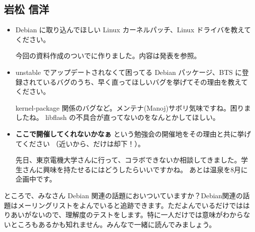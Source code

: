 \documentclass[mingoth,a4paper]{jsarticle}
\begin{document}
\subsection{岩松 信洋}
\begin{itemize}
\item Debian に取り込んでほしい Linux カーネルパッチ、Linux ドライバを教えてください。

今回の資料作成のついでに作りました。内容は発表を参照。

\item unstable でアップデートされなくて困ってる Debian パッケージ、BTS に登録されているバグのうち、早く直ってほしいバグを挙げてその理由を教えてください。

kernel-package 関係のバグなど。メンテナ(Manoj)サボリ気味ですね。困りましたね。
libflash の不具合が直ってないのをなんとかしてほしい。

\item {\bf ここで開催してくれないかなぁ} という勉強会の開催地をその理由と共に挙げてください （近いから、だけは却下！）。

先日、東京電機大学さんに行って、コラボできないか相談してきました。学生さんに興味を持たせるにはどうしたらいいですかね。
あとは温泉を8月に企画中です。

\end{itemize}


ところで、みなさん Debian 関連の話題においついていますか？Debian関連の話
題はメーリングリストをよんでいると追跡できます。ただよんでいるだけではは
りあいがないので、理解度のテストをします。特に一人だけでは意味がわからな
いところもあるかも知れません。みんなで一緒に読んでみましょう。
\end{document}
